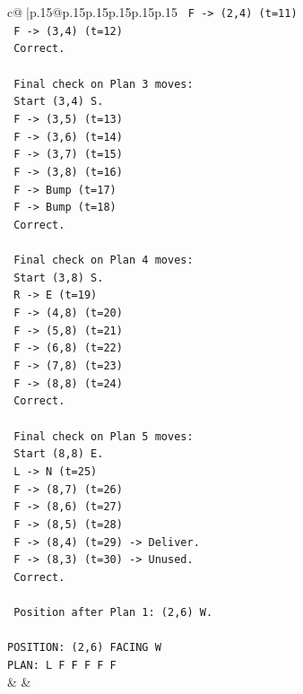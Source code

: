 \documentclass{article}
\begin{document}
{\begin{supertabular}{c@{$\;$}|p{.15\linewidth}@{}p{.15\linewidth}p{.15\linewidth}p{.15\linewidth}p{.15\linewidth}p{.15\linewidth}}
{{{\texttt{   F {-}> (2,4) (t=11)} \\
\texttt{   F {-}> (3,4) (t=12)} \\
\texttt{   Correct.} \\
\\ 
\texttt{   Final check on Plan 3 moves:} \\
\texttt{   Start (3,4) S.} \\
\texttt{   F {-}> (3,5) (t=13)} \\
\texttt{   F {-}> (3,6) (t=14)} \\
\texttt{   F {-}> (3,7) (t=15)} \\
\texttt{   F {-}> (3,8) (t=16)} \\
\texttt{   F {-}> Bump (t=17)} \\
\texttt{   F {-}> Bump (t=18)} \\
\texttt{   Correct.} \\
\\ 
\texttt{   Final check on Plan 4 moves:} \\
\texttt{   Start (3,8) S.} \\
\texttt{   R {-}> E (t=19)} \\
\texttt{   F {-}> (4,8) (t=20)} \\
\texttt{   F {-}> (5,8) (t=21)} \\
\texttt{   F {-}> (6,8) (t=22)} \\
\texttt{   F {-}> (7,8) (t=23)} \\
\texttt{   F {-}> (8,8) (t=24)} \\
\texttt{   Correct.} \\
\\ 
\texttt{   Final check on Plan 5 moves:} \\
\texttt{   Start (8,8) E.} \\
\texttt{   L {-}> N (t=25)} \\
\texttt{   F {-}> (8,7) (t=26)} \\
\texttt{   F {-}> (8,6) (t=27)} \\
\texttt{   F {-}> (8,5) (t=28)} \\
\texttt{   F {-}> (8,4) (t=29) {-}> Deliver.} \\
\texttt{   F {-}> (8,3) (t=30) {-}> Unused.} \\
\texttt{   Correct.} \\
\\ 
\texttt{   Position after Plan 1: (2,6) W.} \\
\\ 
\texttt{POSITION: (2,6) FACING W} \\
\texttt{PLAN: L F F F F F} \\
            }
        }
    }
    & & \\ \\


\end{supertabular}}
\end{document}
